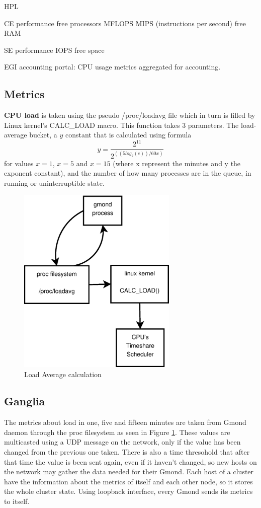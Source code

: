 HPL
\cite{gridbench}

CE performance
free processors
MFLOPS
MIPS (instructions per second)
free RAM

SE performance
IOPS
free space

EGI accounting portal: CPU usage metrics aggregated for accounting.
\newpage

\subsection{Metrics}

{\bf CPU load} is taken using the pseudo /proc/loadavg file which in turn is
filled by Linux kernel's CALC\_LOAD macro. This function takes 3 parameters.
The load-average bucket, a $y$ constant that is calculated using formula
\[
y=\frac{2^{11}}{2^{((5log_2(e))/60x)}}
\]
for values $x=1$, $x=5$ and $x=15$ (where x represent the minutes and y the
exponent constant), and the number of how many processes are in the queue, in
running or uninterruptible state.

\begin{figure}[htb]
\centering
 \includegraphics[width=3in]{images/calc_load.eps}
\caption{Load Average calculation}
\label{figure:calc_load}
\end{figure}

\newpage

\subsection{Ganglia}

The metrics about load in one, five and fifteen minutes are taken from Gmond daemon through the proc filesystem as seen in Figure \ref{figure:calc_load}. These values are multicasted using a UDP message on the network, only if the value has been changed from the previous one taken. There is also a time thresohold that after that time the value is been sent again, even if it haven't changed, so new hosts on the network may gather the data needed for their Gmond. Each host of a cluster have the information about the metrics of itself and each other node, so it stores the whole cluster state. Using loopback interface, every Gmond sends its metrics to itself.

